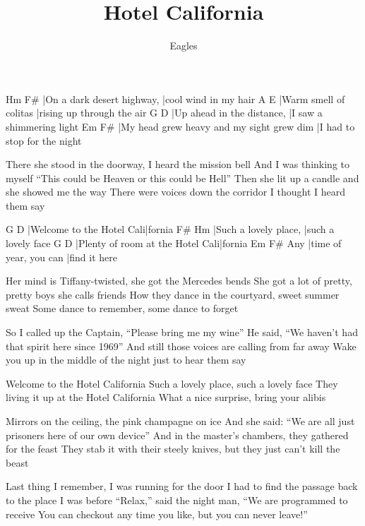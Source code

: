 \documentclass{song}
\title{Hotel California}
\author{Eagles}
\begin{document}
\strophe
Hm                         F\#
|On a dark desert highway, |cool wind in my hair
A                      E
|Warm smell of colitas |rising up through the air
G                          D
|Up ahead in the distance, |I saw a shimmering light
Em                                        F\#
|My head grew heavy and my sight grew dim |I had to stop for the night
\endstrophe

\strophe*
There she stood in the doorway, I heard the mission bell
And I was thinking to myself ``This could be Heaven or this could be Hell''
Then she lit up a candle and she showed me the way
There were voices down the corridor I thought I heard them say
\endstrophe

G                         D
|Welcome to the Hotel Cali|fornia
F\#                   Hm
|Such a lovely place, |such a lovely face
G                                D
|Plenty of room at the Hotel Cali|fornia
    Em                     F\#
Any |time of year, you can |find it here
\endstrophe

\strophe*
Her mind is Tiffany-twisted, she got the Mercedes bends
She got a lot of pretty, pretty boys she calls friends
How they dance in the courtyard, sweet summer sweat
Some dance to remember, some dance to forget
\endstrophe

\strophe*
So I called up the Captain, ``Please bring me my wine''
He said, ``We haven't had that spirit here since 1969''
And still those voices are calling from far away
Wake you up in the middle of the night just to hear them say
\endstrophe

Welcome to the Hotel California
Such a lovely place, such a lovely face
They living it up at the Hotel California
What a nice surprise, bring your alibis
\endstrophe

\strophe*
Mirrors on the ceiling, the pink champagne on ice
And she said: ``We are all just prisoners here of our own device''
And in the master's chambers, they gathered for the feast
They stab it with their steely knives, but they just can't kill the beast
\endstrophe

\strophe*
Last thing I remember, I was running for the door
I had to find the passage back to the place I was before
``Relax,'' said the night man, ``We are programmed to receive
You can checkout any time you like, but you can never leave!''
\endstrophe
\end{document}
